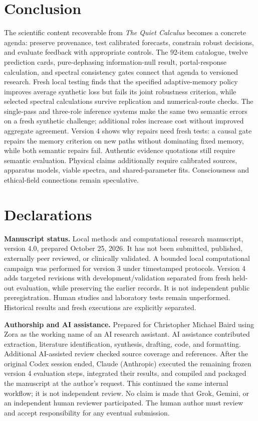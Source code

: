 \section{Conclusion}
The scientific content recoverable from \emph{The Quiet Calculus} becomes a concrete agenda: preserve provenance, test calibrated forecasts, constrain robust decisions, and evaluate feedback with appropriate controls. The 92-item catalogue, twelve prediction cards, pure-dephasing information-null result, portal-response calculation, and spectral consistency gates connect that agenda to versioned research. Fresh local testing finds that the specified adaptive-memory policy improves average synthetic loss but fails its joint robustness criterion, while selected spectral calculations survive replication and numerical-route checks. The single-pass and three-role inference systems make the same two semantic errors on a fresh synthetic challenge; additional roles increase cost without improved aggregate agreement. Version 4 shows why repairs need fresh tests: a causal gate repairs the memory criterion on new paths without dominating fixed memory, while both semantic repairs fail. Authentic evidence quotations still require semantic evaluation. Physical claims additionally require calibrated sources, apparatus models, viable spectra, and shared-parameter fits. Consciousness and ethical-field connections remain speculative.

\clearpage
\section*{Declarations}
\textbf{Manuscript status.} Local methods and computational research manuscript, version 4.0, prepared October 25, 2026. It has not been submitted, published, externally peer reviewed, or clinically validated. A bounded local computational campaign was performed for version 3 under timestamped protocols. Version 4 adds targeted revisions with development/validation separated from fresh held-out evaluation, while preserving the earlier records. It is not independent public preregistration. Human studies and laboratory tests remain unperformed. Historical results and fresh executions are explicitly separated.

\textbf{Authorship and AI assistance.} Prepared for Christopher Michael Baird using Zora as the working name of an AI research assistant. AI assistance contributed extraction, literature identification, synthesis, drafting, code, and formatting. Additional AI-assisted review checked source coverage and references. After the original Codex session ended, Claude (Anthropic) executed the remaining frozen version 4 evaluation steps, integrated their results, and compiled and packaged the manuscript at the author's request. This continued the same internal workflow; it is not independent review. No claim is made that Grok, Gemini, or an independent human reviewer participated. The human author must review and accept responsibility for any eventual submission.

